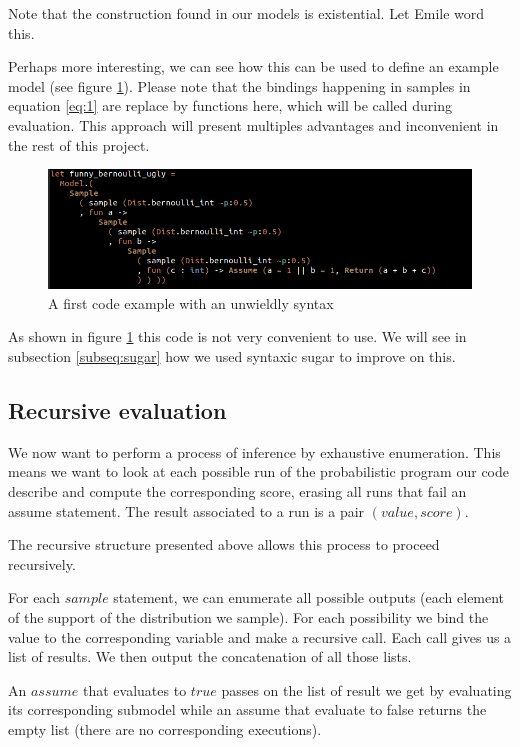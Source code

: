 \documentclass{article}
\newcommand\SC[1]{{\color{violet}{\it \bf Simon :} #1}}
\begin{document}
	
	Note that the construction found in our models is existential. \SC{Let Emile word this.}

	Perhaps more interesting, we can see how this can be used to define an example model (see figure \ref{fig:UglyEx}).
	Please note that the bindings happening in samples in equation \ref{eq:1} are replace by functions here, which will be called during evaluation.
	This approach will present multiples advantages and inconvenient in the rest of this project.

	\begin{figure}[h]
	  \centering
	  \includegraphics[scale=0.5]{images/ExampleUgly.png}
	  \caption{A first code example with an unwieldly syntax}
	  \label{fig:UglyEx}
	\end{figure}

	As shown in figure \ref{fig:UglyEx} this code is not very convenient to use. We will see in subsection \ref{subseq:sugar} how we used syntaxic sugar to improve on this.

	\subsection{Recursive evaluation}

	We now want to perform a process of inference by exhaustive enumeration.
	This means we want to look at each possible run of the probabilistic program our code describe and compute the corresponding score, erasing all runs that fail an assume statement.
	The result associated to a run is a pair $(value, score)$.

	The recursive structure presented above allows this process to proceed recursively.

	For each $sample$ statement, we can enumerate all possible outputs (each element of the support of the distribution we sample). For each possibility we bind the value to the corresponding variable and make a recursive call.
	Each call gives us a list of results. We then output the concatenation of all those lists.

	An $assume$ that evaluates to $true$ passes on the list of result we get by evaluating its corresponding submodel while an assume that evaluate to false returns the empty list (there are no corresponding executions).
\end{document}
